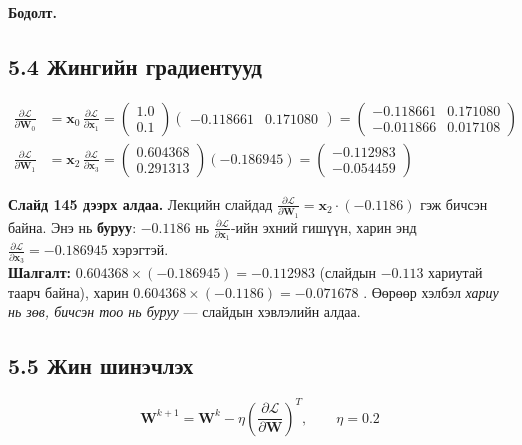 \documentclass[11pt]{article}
\newenvironment{solution}[1][\textbf{Бодолт.}]
    { \noindent #1 \smallskip \\ }
    { \medskip }
\newcommand{\dL}[1]{\frac{\partial \mathcal{L}}{\partial #1}}
\begin{document}
\begin{solution}
\subsection*{5.4 Жингийн градиентууд}
\begin{align}
\dL{\mathbf{W}_0} &= \mathbf{x}_0 \,\dL{\mathbf{x}_1}
= \begin{pmatrix} 1.0 \\ 0.1 \end{pmatrix}
  \begin{pmatrix} -0.118661 & 0.171080 \end{pmatrix}
= \begin{pmatrix} -0.118661 & 0.171080 \\ -0.011866 & 0.017108 \end{pmatrix} \\[8pt]
\dL{\mathbf{W}_1} &= \mathbf{x}_2 \,\dL{\mathbf{x}_3}
= \begin{pmatrix} 0.604368 \\ 0.291313 \end{pmatrix}(-0.186945)
= \begin{pmatrix} -0.112983 \\ -0.054459 \end{pmatrix}
\end{align}

\begin{mdframed}[backgroundcolor=red!8]
\textbf{Слайд 145 дээрх алдаа.} Лекцийн слайдад
$\dL{\mathbf{W}_1} = \mathbf{x}_2 \cdot (-0.1186)$ гэж бичсэн байна. Энэ нь \textbf{буруу}:
$-0.1186$ нь $\dL{\mathbf{x}_1}$-ийн эхний гишүүн, харин энд $\dL{\mathbf{x}_3} = -0.186945$
хэрэгтэй. \\[4pt]
\textbf{Шалгалт:} $0.604368 \times (-0.186945) = -0.112983$ \checkmark{} (слайдын
$-0.113$ хариутай таарч байна), харин $0.604368 \times (-0.1186) = -0.071678$ .
Өөрөөр хэлбэл \emph{хариу нь зөв, бичсэн тоо нь буруу} — слайдын хэвлэлийн алдаа.
\end{mdframed}

\subsection*{5.5 Жин шинэчлэх}
\[
\mathbf{W}^{k+1} = \mathbf{W}^{k} - \eta\left(\dL{\mathbf{W}}\right)^{T}, \qquad \eta = 0.2
\]

\end{solution}
\end{document}
